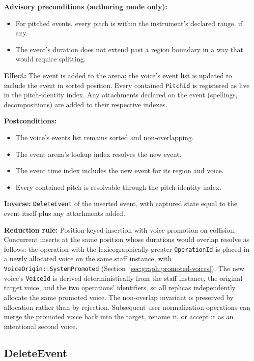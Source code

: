 \documentclass[11pt,letterpaper]{report}
\begin{document}
\textbf{Advisory preconditions (authoring mode only):}
\begin{itemize}
  \item For pitched events, every pitch is within the instrument's
    declared range, if any.
  \item The event's duration does not extend past a region boundary
    in a way that would require splitting.
\end{itemize}

\textbf{Effect:} The event is added to the arena; the voice's event
list is updated to include the event in sorted position. Every
contained \texttt{PitchId} is registered as live in the
pitch-identity index. Any attachments declared on the event
(spellings, decompositions) are added to their respective indexes.

\textbf{Postconditions:}
\begin{itemize}
  \item The voice's events list remains sorted and non-overlapping.
  \item The event arena's lookup index resolves the new event.
  \item The event time index includes the new event for its region
    and voice.
  \item Every contained pitch is resolvable through the
    pitch-identity index.
\end{itemize}

\textbf{Inverse:} \texttt{DeleteEvent} of the inserted event, with
captured state equal to the event itself plus any attachments added.

\textbf{Reduction rule:} Position-keyed insertion with voice promotion
on collision. Concurrent inserts at the same position whose durations
would overlap resolve as follows: the operation with the
lexicographically-greater \texttt{OperationId} is placed in a newly
allocated voice on the same staff instance, with
\texttt{VoiceOrigin::SystemPromoted} (Section~\ref{sec:graph:promoted-voices}).
The new voice's \texttt{VoiceId} is derived deterministically from the
staff instance, the original target voice, and the two operations'
identifiers, so all replicas independently allocate the same promoted
voice. The non-overlap invariant is preserved by allocation rather
than by rejection. Subsequent user normalization operations can merge
the promoted voice back into the target, rename it, or accept it as
an intentional second voice.

\subsection{DeleteEvent}
\label{sec:semops:deleteevent}
\end{document}
